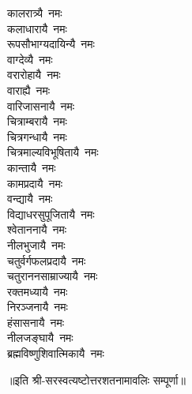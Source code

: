 \begin{multicols}{2}
\begin{flushleft}
कालरात्र्यै~नमः\\
कलाधारायै~नमः\\
रूपसौभाग्यदायिन्यै~नमः\\
वाग्देव्यै~नमः\\
वरारोहायै~नमः\hfill{}\\
वाराह्यै~नमः\\
वारिजासनायै~नमः\\
चित्राम्बरायै~नमः\\
चित्रगन्धायै~नमः\\
चित्रमाल्यविभूषितायै~नमः\\
कान्तायै~नमः\\
कामप्रदायै~नमः\\
वन्द्यायै~नमः\\
विद्याधरसुपूजितायै~नमः\\
श्वेताननायै~नमः\hfill{}\\
नीलभुजायै~नमः\\
चतुर्वर्गफलप्रदायै~नमः\\
चतुराननसाम्राज्यायै~नमः\\
रक्तमध्यायै~नमः\\
निरञ्जनायै~नमः\\
हंसासनायै~नमः\\
नीलजङ्घायै~नमः\\
ब्रह्मविष्णुशिवात्मिकायै~नमः\hfill{}\\
\end{flushleft}
\end{multicols}
॥इति श्री-सरस्वत्यष्टोत्तरशतनामावलिः सम्पूर्णा॥

